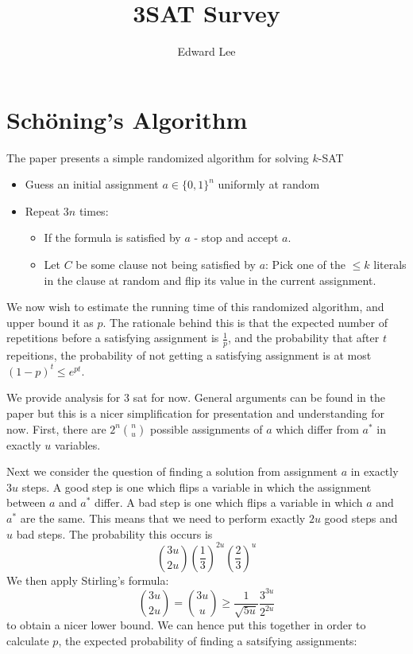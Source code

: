 \documentclass[12pt, a4paper]{article}
\title{3SAT Survey}
\author{Edward Lee}
\theoremstyle{definition}
\begin{document}
\maketitle

\section{Sch\"{o}ning's Algorithm}

The paper \cite{SchoningA99} presents a simple randomized algorithm for solving $k$-SAT

\begin{itemize}
	\item Guess an initial assignment $a \in \{0,1\}^n$ uniformly at random
	\item Repeat $3n$ times: 
	\begin{itemize}
		\item If the formula is satisfied by $a$ - stop and accept $a$.
		\item Let $C$ be some clause not being satisfied by $a$: Pick one of the $\leq k$ literals in the clause at random and flip its value in the current assignment.
	\end{itemize}
\end{itemize}

We now wish to estimate the running time of this randomized algorithm, and upper bound it as $p$. The rationale behind this is that the expected number of repetitions before a satisfying assignment is $\frac{1}{p}$, and the probability that after $t$ repeitions, the probability of not getting a satisfying assignment is at most $(1-p)^t \leq e^{pt}$.

We provide analysis for 3 sat for now. General arguments can be found in the paper but this is a nicer simplification for presentation and understanding for now. First, there are $2^n \binom{n}{u}$ possible assignments of $a$ which differ from $a^*$ in exactly $u$ variables.

Next we consider the question of finding a solution from assignment $a$ in exactly $3u$ steps. 
A good step is one which flips a variable in which the assignment between $a$ and $a^*$ differ. A bad step is one which flips a variable in which $a$ and $a^*$ are the same. This means that we need to perform exactly $2u$ good steps and $u$ bad steps. The probability this occurs is
\[
	\binom{3u}{2u} \left(\frac{1}{3}\right)^{2u} \left( \frac{2}{3}\right)^{u}
\]
We then apply Stirling's formula:
\[
	\binom{3u}{2u} = \binom{3u}{u} \geq \frac{1}{\sqrt{5u}} \frac{3^{3u}}{2^{2u}}
\]
to obtain a nicer lower bound. We can hence put this together in order to calculate $p$, the expected probability of finding a satsifying assignments:
\end{document}
